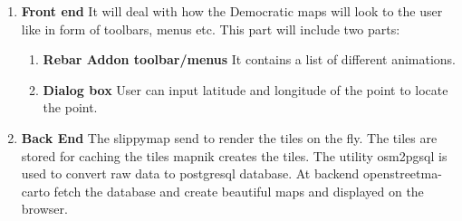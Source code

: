 \begin{enumerate}
	\item \textbf{Front end}
	It will deal with how the Democratic maps will look to the user like in form of toolbars, menus etc. This part will include two parts:
	\begin{enumerate}
		\item \textbf{Rebar Addon toolbar/menus}
		It contains a list of different animations.
		\item \textbf{Dialog box}
		User can input latitude and longitude of the point to locate the point.
	\end{enumerate}

	
	\item \textbf{Back End}
       The slippymap send to render the tiles on the fly. The tiles are stored for caching the tiles mapnik creates the tiles. The utility osm2pgsql is used to convert raw data to postgresql database. At backend openstreetma-carto fetch the database and create beautiful maps and displayed on the browser. 	
\end{enumerate}

